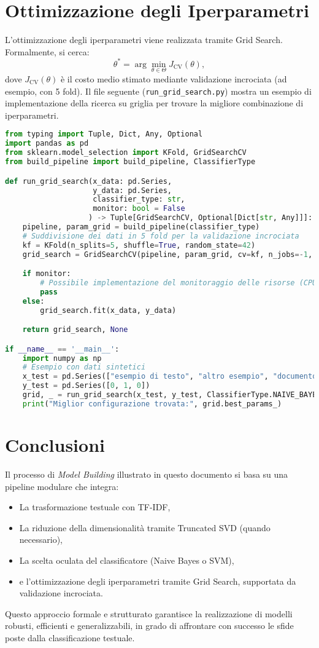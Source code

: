 \section{Ottimizzazione degli Iperparametri}
L'ottimizzazione degli iperparametri viene realizzata tramite Grid Search. Formalmente, si cerca:
\[
\theta^* = \arg \min_{\theta \in \Theta} J_{\text{CV}}(\theta),
\]
dove \(J_{\text{CV}}(\theta)\) è il costo medio stimato mediante validazione incrociata (ad esempio, con 5 fold).
Il file seguente (\texttt{run\_grid\_search.py}) mostra un esempio di implementazione della ricerca su griglia per trovare la migliore combinazione di iperparametri.

\begin{lstlisting}[language=Python]
from typing import Tuple, Dict, Any, Optional
import pandas as pd
from sklearn.model_selection import KFold, GridSearchCV
from build_pipeline import build_pipeline, ClassifierType

def run_grid_search(x_data: pd.Series,
                    y_data: pd.Series,
                    classifier_type: str,
                    monitor: bool = False
                   ) -> Tuple[GridSearchCV, Optional[Dict[str, Any]]]:
    pipeline, param_grid = build_pipeline(classifier_type)
    # Suddivisione dei dati in 5 fold per la validazione incrociata
    kf = KFold(n_splits=5, shuffle=True, random_state=42)
    grid_search = GridSearchCV(pipeline, param_grid, cv=kf, n_jobs=-1, verbose=0)

    if monitor:
        # Possibile implementazione del monitoraggio delle risorse (CPU, memoria, tempo)
        pass
    else:
        grid_search.fit(x_data, y_data)

    return grid_search, None

if __name__ == '__main__':
    import numpy as np
    # Esempio con dati sintetici
    x_test = pd.Series(["esempio di testo", "altro esempio", "documento di prova"])
    y_test = pd.Series([0, 1, 0])
    grid, _ = run_grid_search(x_test, y_test, ClassifierType.NAIVE_BAYES)
    print("Miglior configurazione trovata:", grid.best_params_)
\end{lstlisting}

\section{Conclusioni}
Il processo di \emph{Model Building} illustrato in questo documento si basa su una pipeline modulare che integra:
\begin{itemize}
  \item La trasformazione testuale con TF-IDF,
  \item La riduzione della dimensionalità tramite Truncated SVD (quando necessario),
  \item La scelta oculata del classificatore (Naive Bayes o SVM),
  \item e l'ottimizzazione degli iperparametri tramite Grid Search, supportata da validazione incrociata.
\end{itemize}
Questo approccio formale e strutturato garantisce la realizzazione di modelli robusti, efficienti e generalizzabili, in grado di affrontare con successo le sfide poste dalla classificazione testuale.
